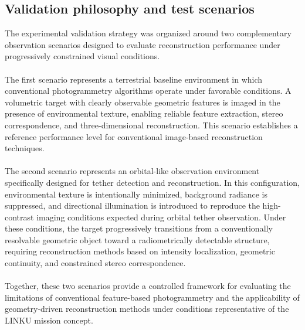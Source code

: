 \subsection{Validation philosophy and test scenarios}
The experimental validation strategy was organized around two complementary observation scenarios designed to evaluate reconstruction performance under progressively constrained visual conditions.
\\\\
The first scenario represents a terrestrial baseline environment in which conventional photogrammetry algorithms operate under favorable conditions. A volumetric target with clearly observable geometric features is imaged in the presence of environmental texture, enabling reliable feature extraction, stereo correspondence, and three-dimensional reconstruction. This scenario establishes a reference performance level for conventional image-based reconstruction techniques.
\\\\
The second scenario represents an orbital-like observation environment specifically designed for tether detection and reconstruction. In this configuration, environmental texture is intentionally minimized, background radiance is suppressed, and directional illumination is introduced to reproduce the high-contrast imaging conditions expected during orbital tether observation. Under these conditions, the target progressively transitions from a conventionally resolvable geometric object toward a radiometrically detectable structure, requiring reconstruction methods based on intensity localization, geometric continuity, and constrained stereo correspondence.
\\\\
Together, these two scenarios provide a controlled framework for evaluating the limitations of conventional feature-based photogrammetry and the applicability of geometry-driven reconstruction methods under conditions representative of the LINKU mission concept.

